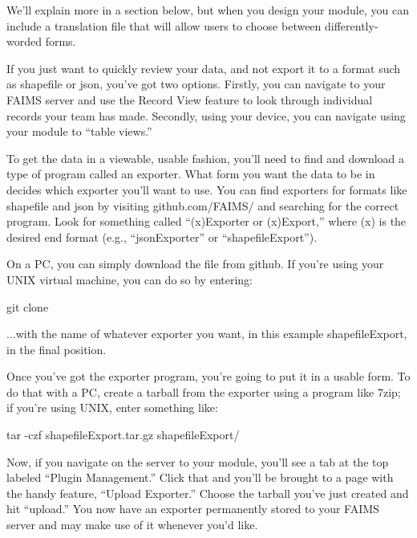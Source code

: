 
We'll explain more in a section below, but when you design your module, you can include a translation file that will allow users to choose between differently-worded forms.


If you just want to quickly review your data, and not export it to a format such as shapefile or json, you've got two options. Firstly, you can navigate to your FAIMS server and use the Record View feature to look through individual records your team has made. Secondly, using your device, you can navigate using your module to “table views.”


To get the data in a viewable, usable fashion, you'll need to find and download a type of program called an exporter. What form you want the data to be in decides which exporter you'll want to use. You can find exporters for formats like shapefile and json by visiting github.com/FAIMS/ and searching for the correct program. Look for something called “(x)Exporter or (x)Export,” where (x) is the desired end format (e.g., “jsonExporter” or “shapefileExport”).

On a PC, you can simply download the file from github. If you're using your UNIX virtual machine, you can do so by entering:

git clone \from[url1]

...with the name of whatever exporter you want, in this example shapefileExport, in the final position.

Once you've got the exporter program, you're going to put it in a usable form. To do that with a PC, create a tarball from the exporter using a program like 7zip; if you're using UNIX, enter something like:

tar -czf shapefileExport.tar.gz shapefileExport/

Now, if you navigate on the server to your module, you'll see a tab at the top labeled “Plugin Management.” Click that and you'll be brought to a page with the handy feature, “Upload Exporter.” Choose the tarball you've just created and hit “upload.” You now have an exporter permanently stored to your FAIMS server and may make use of it whenever you'd like.


